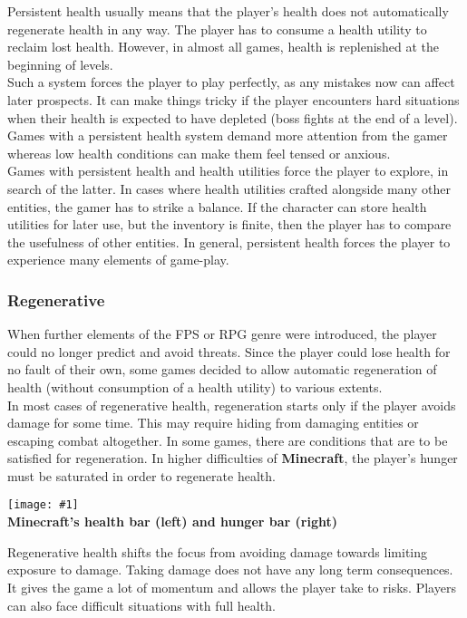 \documentclass[12pt]{article}
\newcommand{\fig}[3]{\begin{center} \texttt{[image: \#1]}\\ \textbf{#3} \end{center}}
\begin{document}
Persistent health usually means that the player's health does not automatically regenerate health in any way. The player has to consume a health utility to reclaim lost health. However, in almost all games, health is replenished at the beginning of levels.\\

Such a system forces the player to play perfectly, as any mistakes now can affect later prospects. It can make things tricky if the player encounters hard situations when their health is expected to have depleted (boss fights at the end of a level). Games with a persistent health system demand more attention from the gamer whereas low health conditions can make them feel tensed or anxious.\\

Games with persistent health and health utilities force the player to explore, in search of the latter. In cases where health utilities crafted alongside many other entities, the gamer has to strike a balance. If the character can store health utilities for later use, but the inventory is finite, then the player has to compare the usefulness of other entities. In general, persistent health forces the player to experience many elements of game-play.

\subsubsection*{Regenerative}

When further elements of the FPS or RPG genre were introduced, the player could no longer predict and avoid threats. Since the player could lose health for no fault of their own, some games decided to allow automatic regeneration of health (without consumption of a health utility) to various extents.\\

In most cases of regenerative health, regeneration starts only if the player avoids damage for some time. This may require hiding from damaging entities or escaping combat altogether. In some games, there are conditions that are to be satisfied for regeneration. In higher difficulties of \textbf{Minecraft}, the player's hunger must be saturated in order to regenerate health.\\

\fig{minecraft_bars.png}{0.1}{Minecraft's health bar (left) and hunger bar (right)}

Regenerative health shifts the focus from avoiding damage towards limiting exposure to damage. Taking damage does not have any long term consequences. It gives the game a lot of momentum and allows the player take to risks. Players can also face difficult situations with full health.
\end{document}
